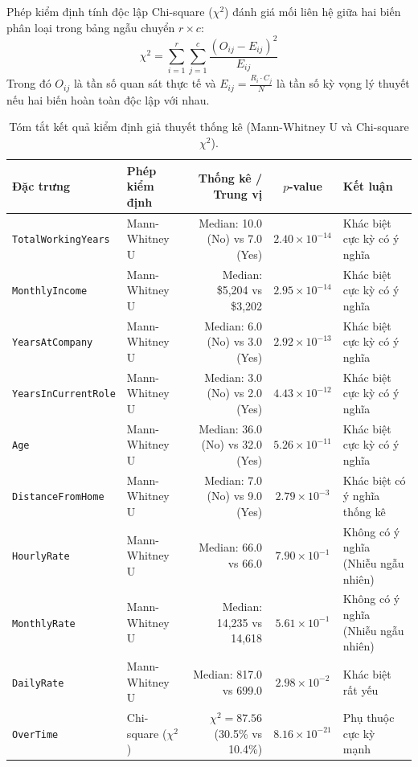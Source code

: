 \documentclass[12pt,a4paper]{article}
\begin{document}
Phép kiểm định tính độc lập Chi-square ($\chi^2$) đánh giá mối liên hệ giữa hai biến phân loại trong bảng ngẫu chuyển $r \times c$:
\begin{equation}
\chi^2 = \sum_{i=1}^r \sum_{j=1}^c \frac{(O_{ij} - E_{ij})^2}{E_{ij}}
\end{equation}
Trong đó $O_{ij}$ là tần số quan sát thực tế và $E_{ij} = \frac{R_i \cdot C_j}{N}$ là tần số kỳ vọng lý thuyết nếu hai biến hoàn toàn độc lập với nhau.

\begin{table}[H]
\centering
\caption{Tóm tắt kết quả kiểm định giả thuyết thống kê (Mann-Whitney U và Chi-square $\chi^2$).}
\label{tab:stat_tests}
\small
\begin{tabular}{|l|l|r|c|l|}
\hline
\textbf{Đặc trưng} & \textbf{Phép kiểm định} & \textbf{Thống kê / Trung vị} & \textbf{$p$-value} & \textbf{Kết luận} \\
\hline
\texttt{TotalWorkingYears} & Mann-Whitney U & Median: 10.0 (No) vs 7.0 (Yes) & $2.40 \times 10^{-14}$ & Khác biệt cực kỳ có ý nghĩa \\
\hline
\texttt{MonthlyIncome} & Mann-Whitney U & Median: \$5,204 vs \$3,202 & $2.95 \times 10^{-14}$ & Khác biệt cực kỳ có ý nghĩa \\
\hline
\texttt{YearsAtCompany} & Mann-Whitney U & Median: 6.0 (No) vs 3.0 (Yes) & $2.92 \times 10^{-13}$ & Khác biệt cực kỳ có ý nghĩa \\
\hline
\texttt{YearsInCurrentRole}& Mann-Whitney U & Median: 3.0 (No) vs 2.0 (Yes) & $4.43 \times 10^{-12}$ & Khác biệt cực kỳ có ý nghĩa \\
\hline
\texttt{Age} & Mann-Whitney U & Median: 36.0 (No) vs 32.0 (Yes)& $5.26 \times 10^{-11}$ & Khác biệt cực kỳ có ý nghĩa \\
\hline
\texttt{DistanceFromHome} & Mann-Whitney U & Median: 7.0 (No) vs 9.0 (Yes) & $2.79 \times 10^{-3}$ & Khác biệt có ý nghĩa thống kê \\
\hline
\texttt{HourlyRate} & Mann-Whitney U & Median: 66.0 vs 66.0 & $7.90 \times 10^{-1}$ & Không có ý nghĩa (Nhiễu ngẫu nhiên) \\
\hline
\texttt{MonthlyRate} & Mann-Whitney U & Median: 14,235 vs 14,618 & $5.61 \times 10^{-1}$ & Không có ý nghĩa (Nhiễu ngẫu nhiên) \\
\hline
\texttt{DailyRate} & Mann-Whitney U & Median: 817.0 vs 699.0 & $2.98 \times 10^{-2}$ & Khác biệt rất yếu \\
\hline
\texttt{OverTime} & Chi-square ($\chi^2$) & $\chi^2 = 87.56$ (30.5\% vs 10.4\%) & $8.16 \times 10^{-21}$ & Phụ thuộc cực kỳ mạnh \\

\end{tabular}
\end{table}
\end{document}
